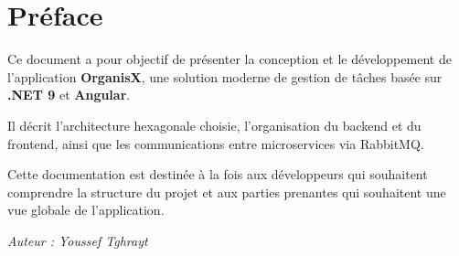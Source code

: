 \chapter*{Préface}

Ce document a pour objectif de présenter la conception et le développement de l'application \textbf{OrganisX}, une solution moderne de gestion de tâches basée sur \textbf{.NET 9} et \textbf{Angular}.

Il décrit l'architecture hexagonale choisie, l'organisation du backend et du frontend, ainsi que les communications entre microservices via RabbitMQ. 

Cette documentation est destinée à la fois aux développeurs qui souhaitent comprendre la structure du projet et aux parties prenantes qui souhaitent une vue globale de l'application.

\bigskip
\textit{Auteur : Youssef Tghrayt}
